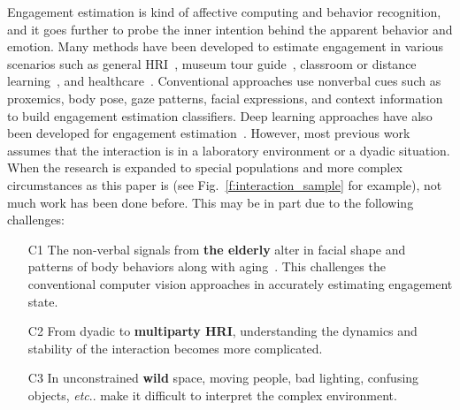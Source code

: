 \documentclass[VANCOUVER,STIX1COL]{WileyNJD-v2}
\makeatletter
\DeclareRobustCommand\onedot{\futurelet\@let@token\@onedot}
\def\@onedot{\ifx\@let@token.\else.\null\fi\xspace}
\def\etc{\emph{etc}\onedot}
\makeatother
\begin{document}
Engagement estimation is kind of affective computing and behavior recognition, and it goes further to probe the inner intention behind the apparent behavior and emotion. Many methods have been developed to estimate engagement in various scenarios such as general HRI~\cite{Salam2017Fully,Celiktutan2019Multimodal, BenYoussef2019Early,Saleh2021Improving}, museum tour guide~\cite{DelDuchetto2020Are}, classroom or distance learning~\cite{BenEliyahu2018Investigating,Zhu2020Multirate,Rudovic2019Personalized,Sumer2021Multimodal, Monkaresi2017Automated, Abedi2021Affectdriven,Gao2020NGage}, and healthcare~\cite{Anagnostopoulou2021Engagement,Jain2020Modeling,Jones2018Engagement,Steinert2020Engagement}. Conventional approaches use nonverbal cues such as proxemics, body pose, gaze patterns, facial expressions, and context information to build engagement estimation classifiers. Deep learning approaches have also been developed for engagement estimation~\cite{DelDuchetto2020Are,Zhu2020Multirate,Guhan2020ABCNet,Saleh2021Improving,Sumer2021Multimodal,Anagnostopoulou2021Engagement}. However, most previous work assumes that the interaction is in a laboratory environment or a dyadic  situation. When the research is expanded to special populations and more complex circumstances as this paper is (see Fig.~\ref{f:interaction_sample} for example), not much work has been done before. This may be in part due to the following challenges:
\begin{enumerate}
  \item[C1] The non-verbal signals from \textbf{the elderly} alter in facial shape and patterns of body behaviors along with aging~\cite{Guo2013Facial,Folster2014Facial}. This challenges the conventional computer vision approaches in accurately estimating engagement state.
  \item[C2] From dyadic to \textbf{multiparty HRI}, understanding the dynamics and stability of the interaction becomes more complicated.
  \item[C3] In unconstrained \textbf{wild} space, moving people, bad lighting, confusing objects, \etc make it difficult to interpret the complex environment.
\end{enumerate}
\end{document}
